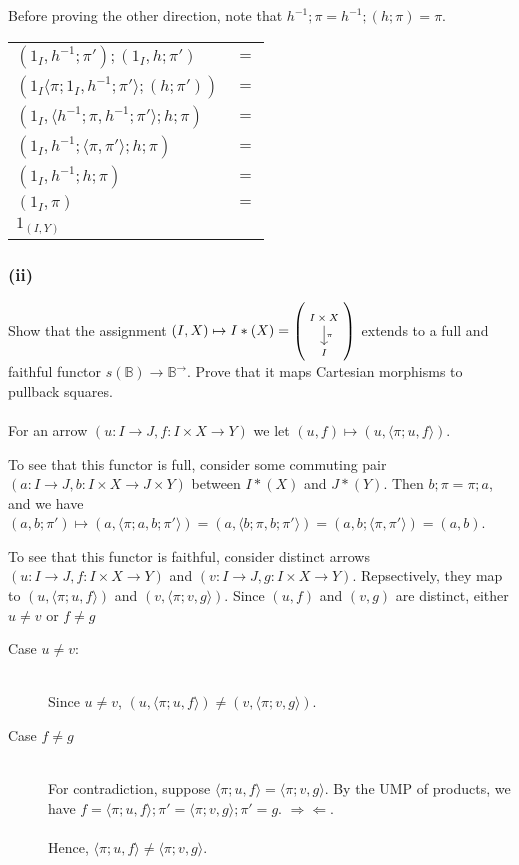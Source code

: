 \documentclass{article}
\newcommand{\ddisp}[3]{
\left(
\scriptsize
\begin{tikzcd}
#1 \ar[d, "\footnotesize{#2}"] \\
#3
\end{tikzcd}
\normalsize
\right)
}
\begin{document}
Before proving the other direction, note that $h^{-1};\pi = h^{-1};(h;\pi) = \pi$.

\begin{center}
\begin{tabular}{ll}
$(1_I, h^{-1};\pi');(1_I,h;\pi')$ & $=$ \\ 
$(1_I \langle \pi;1_I, h^{-1};\pi' \rangle;(h;\pi'))$ & $=$ \\
$(1_I, \langle h^{-1};\pi, h^{-1};\pi' \rangle;h;\pi)$ & $=$ \\
$(1_I, h^{-1};\langle \pi, \pi' \rangle;h;\pi)$ & $=$ \\
$(1_I, h^{-1};h;\pi)$ & $=$ \\
$(1_I, \pi)$ & $=$ \\
$1_{(I,Y)}$ &   
\end{tabular}
\end{center}

\subsubsection*{(ii)}

Show that the assignment $(I, X) \mapsto I*(X) = \ddisp{I \times X}{\pi}{I}$ extends to a full and faithful functor
$s(\mathbb B) \to \mathbb B^{\to}$. Prove that it maps Cartesian morphisms to pullback squares.\\~\\
For an arrow $(u : I \to J, f : I \times X \to Y)$ we let $(u,f) \mapsto (u,\langle \pi;u, f \rangle)$.

To see that this functor is full, consider some commuting pair $(a : I \to J, b : I \times X \to J \times Y)$
between $I*(X)$ and $J*(Y)$. Then $b;\pi = \pi;a$, and we have $(a, b;\pi') \mapsto (a, \langle \pi;a, b;\pi' \rangle)
 = (a, \langle b;\pi, b;\pi' \rangle) = (a, b; \langle \pi, \pi' \rangle) = (a,b)$.
 
To see that this functor is faithful, consider distinct arrows $(u : I \to J, f : I \times X \to Y)$ and 
$(v : I \to J, g : I \times X \to Y)$. Repsectively, they map to $(u, \langle \pi;u, f \rangle)$ and 
$(v, \langle \pi;v, g \rangle)$. Since $(u, f)$ and $(v, g)$ are distinct, either $u \neq v$ or $f \neq g$
\begin{description}
\item[Case $u \neq v$:]~\\
Since $u \neq v$, $(u, \langle \pi;u, f \rangle) \neq (v, \langle \pi;v, g \rangle)$.
\item[Case $f \neq g$]~\\
For contradiction, suppose $\langle \pi;u , f \rangle = \langle \pi;v, g \rangle$. By the 
UMP of products, we have $f = \langle \pi;u , f \rangle;\pi' = \langle \pi;v, g \rangle;\pi' = g$. $\Rightarrow \Leftarrow$.~\\~\\
Hence, $\langle \pi;u , f \rangle \neq \langle \pi;v, g \rangle$.


\end{description}
 
\end{document}
